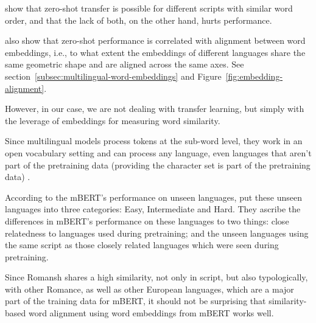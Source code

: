 
\textcite{deshpande-etal-2022-bert} show that zero-shot transfer is possible for different scripts with similar word order, and that the lack of both, on the other hand, hurts performance. 

\textcite{deshpande-etal-2022-bert} also show that zero-shot performance is correlated with alignment between word embeddings, i.e., to what extent the embeddings of different languages share the same geometric shape and are aligned across the same axes. 
See section~\ref{subsec:multilingual-word-embeddings} and Figure~\ref{fig:embedding-alignment}.

However, in our case, we are not dealing with transfer learning, but simply with the leverage of embeddings for measuring word similarity. 

Since multilingual models process tokens at the sub-word level, they work in an open vocabulary setting and can process any language, even languages that aren't part of the pretraining data (providing the character set is part of the pretraining data) \autocite{muller-et-al-2020}.

According to the mBERT's performance on unseen languages, \textcite{muller-et-al-2020} put these unseen languages into three categories: Easy, Intermediate and Hard. 
They ascribe the differences in mBERT's performance on these languages to two things: close relatedness to languages used during pretraining; and the unseen languages using the same script as those closely related languages which were seen during pretraining.

Since Romansh shares a high similarity, not only in script, but also typologically, with other Romance, as well as other European languages\footnotemark{}, which are a major part of the training data for mBERT, it should not be surprising that similarity-based word alignment using word embeddings from mBERT works well.





